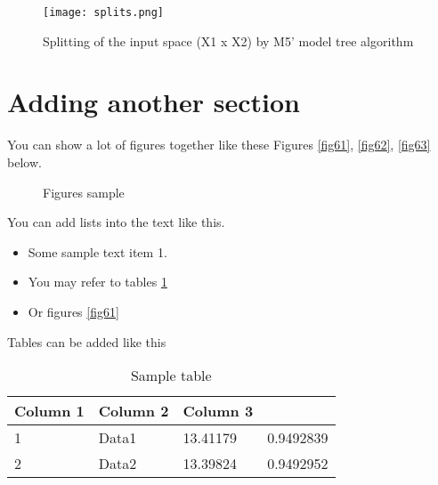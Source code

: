\begin{figure}[]
\centering
\texttt{[image: splits.png]}
\caption{Splitting of the input space (X1 x X2) by M5' model tree algorithm}
\label{fig5}
\end{figure}

\section{Adding another section}
You can show a lot of figures together like these Figures \ref{fig61}, \ref{fig62}, \ref{fig63} below.
\begin{figure} [!htbp]
\centering    
{}
\caption{Figures sample}
\end{figure}
You can add lists into the text like this. 
\begin{itemize}
\settowidth{\leftmargin}{{\Large$\square$}}\advance\leftmargin{}
\itemsep3pt\relax
\renewcommand\labelitemi{{\lower1pt\hbox{\small$\square$}}}
\item	Some sample text item 1. 
\item You may refer to tables \ref{tab1} 
\item Or figures \ref{fig61}
\end{itemize}

Tables can be added like this
\begin{table}[!htbp]
\centering
\caption{Sample table}
\label{tab1}
\begin{tabular}{llll}

\hline
Column 1 & Column 2 & Column 3       \\\hline
1         & Data1 & 13.41179 & 0.9492839 \\
2            & Data2 & 13.39824 & 0.9492952\\\hline
\end{tabular}
\end{table}
